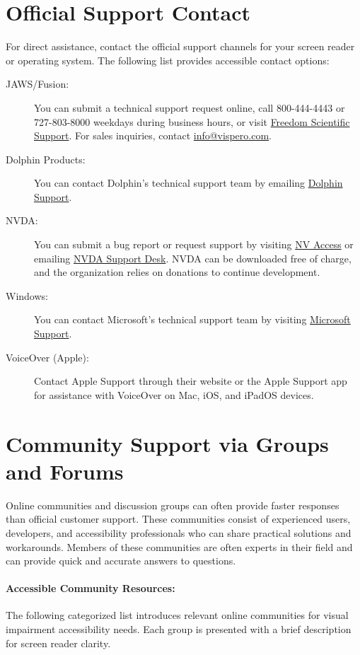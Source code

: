 \section{Official Support Contact}
\label{report}
For direct assistance, contact the official support channels for your screen reader or operating system. The following list provides accessible contact options:

\begin{description}
    \item[JAWS/Fusion:] You can submit a technical support request online, call 800-444-4443 or 727-803-8000 weekdays during business hours, or visit \href{https://support.freedomscientific.com/support}{Freedom Scientific Support}. For sales inquiries, contact \href{mailto:info@vispero.com}{info@vispero.com}.
    \item[Dolphin Products:] You can contact Dolphin's technical support team by emailing \href{mailto:support@yourdolphin.com}{Dolphin Support}.
    \item[NVDA:] You can submit a bug report or request support by visiting \href{https://www.nvaccess.org/}{NV Access} or emailing \href{mailto:info@nvaccess.org}{NVDA Support Desk}. NVDA can be downloaded free of charge, and the organization relies on donations to continue development.
    \item[Windows:] You can contact Microsoft's technical support team by visiting \href{https://support.microsoft.com/}{Microsoft Support}.
    \item[VoiceOver (Apple):] Contact Apple Support through their website or the Apple Support app for assistance with VoiceOver on Mac, iOS, and iPadOS devices.
\end{description}

\section{Community Support via Groups and Forums}
\label{community}
Online communities and discussion groups can often provide faster responses than official customer support. These communities consist of experienced users, developers, and accessibility professionals who can share practical solutions and workarounds. Members of these communities are often experts in their field and can provide quick and accurate answers to questions.

\paragraph{Accessible Community Resources:}
The following categorized list introduces relevant online communities for visual impairment accessibility needs. Each group is presented with a brief description for screen reader clarity.

